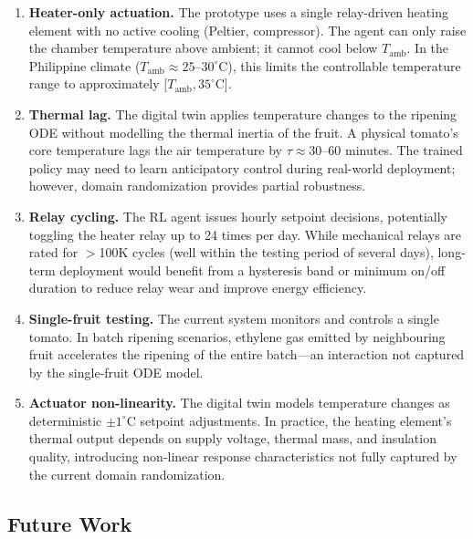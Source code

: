 \documentclass[conference]{IEEEtran}
\begin{document}
    \begin{enumerate}
        \item \textbf{Heater-only actuation.} The prototype uses a single relay-driven heating element with no active cooling (Peltier, compressor). The agent can only raise the chamber temperature above ambient; it cannot cool below $T_{\text{amb}}$.  In the Philippine climate ($T_{\text{amb}} \approx 25$--$30^{\circ}$C), this limits the controllable temperature range to approximately $[T_{\text{amb}}, 35^{\circ}$C].

        \item \textbf{Thermal lag.} The digital twin applies temperature changes to the ripening ODE without modelling the thermal inertia of the fruit. A physical tomato's core temperature lags the air temperature by $\tau \approx 30$--$60$ minutes.  The trained policy may need to learn anticipatory control during real-world deployment; however, domain randomization provides partial robustness.

        \item \textbf{Relay cycling.}  The RL agent issues hourly setpoint decisions, potentially toggling the heater relay up to 24 times per day.  While mechanical relays are rated for $>$100K cycles (well within the testing period of several days), long-term deployment would benefit from a hysteresis band or minimum on/off duration to reduce relay wear and improve energy efficiency.

        \item \textbf{Single-fruit testing.}  The current system monitors and controls a single tomato.  In batch ripening scenarios, ethylene gas emitted by neighbouring fruit accelerates the ripening of the entire batch---an interaction not captured by the single-fruit ODE model.

        \item \textbf{Actuator non-linearity.}  The digital twin models temperature changes as deterministic $\pm 1^{\circ}$C setpoint adjustments.  In practice, the heating element's thermal output depends on supply voltage, thermal mass, and insulation quality, introducing non-linear response characteristics not fully captured by the current domain randomization.
    \end{enumerate}

    \subsection{Future Work}
\end{document}
